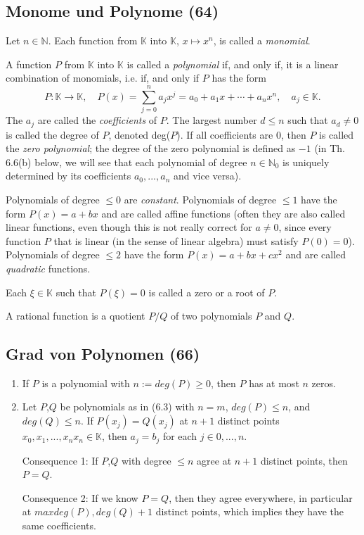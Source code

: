 \subsection{Monome und Polynome (64)}
Let $n \in \mathbb{N}$. Each function from $\mathbb{K}$ into $\mathbb{K}$, $x \mapsto x ^ { n }$, is called a \textit{monomial}.

A function $P$ from $\mathbb{K}$ into $\mathbb{K}$ is called a \textit{polynomial} if, and only if, it is a linear combination of monomials, i.e. if, and only if $P$ has the form
\begin{equation}
P : \mathbb { K } \rightarrow \mathbb { K } ,\quad P ( x ) = \sum _ { j = 0} ^ { n } a _ { j } x ^ { j } = a _ { 0} + a _ { 1} x + \cdots + a _ { n } x ^ { n } ,\quad a _ { j } \in \mathbb { K }.
\end{equation}
The $a_j$ are called the \textit{coefficients} of $P$. The largest number $d \leq n$ such that $a_d \neq 0$ is called the degree of $P$, denoted deg($P$). If all coefficients are $0$, then $P$ is called the \textit{zero polynomial}; the degree of the zero polynomial is defined as $-1$ (in Th. 6.6(b) below, we
will see that each polynomial of degree $n \in \mathbb { N } _ { 0}$ is uniquely determined by its coefficients
$a_0, . . . , a_n$ and vice versa).

Polynomials of degree $\leq 0$ are \textit{constant}. Polynomials of degree $\leq 1$ have the form $P(x) = a+bx$ and are called affine functions (often they are also called linear functions, even though this is not really correct for $a \neq 0$, since every function $P$ that is linear (in the sense of linear algebra) must satisfy $P(0) = 0$). Polynomials of degree $\leq 2$ have the
form $P(x) = a + bx + cx^2$ and are called \textit{quadratic} functions.

Each $\xi \in \mathbb { K }$ such that $P(\xi) = 0$ is called a zero or a root of $P$.

A rational function is a quotient $P/Q$ of two polynomials $P$ and $Q$.

\subsection{Grad von Polynomen (66)}
\begin{enumerate}
\item If $P$ is a polynomial with $n :=deg(P) \geq 0$, then $P$ has at most $n$
zeros.
\item Let $P$,$Q$ be polynomials as in (6.3) with $n = m$, $deg(P) \leq n$, and $deg(Q) \leq n$. If
$P(x_j) = Q(x_j)$ at $n + 1$ distinct points $x_0, x_1, . . . , x_n x _ { n } \in \mathbb { K }$, then $a_j = b_j$ for each
$j \in {0, . . . , n}$.

Consequence 1: If $P$,$Q$ with degree $\leq n$ agree at $n+1$ distinct points, then $P = Q$.

Consequence 2: If we know $P = Q$, then they agree everywhere, in particular at
$max{deg(P), deg(Q)} + 1$ distinct points, which implies they have the same coefficients.
\end{enumerate}